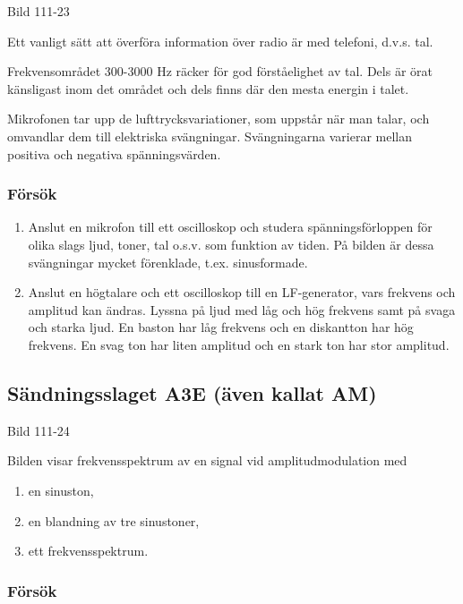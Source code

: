 \documentclass[a4paper,twoside,twocolumn,openright]{book}
\begin{document}
Bild 111-23

Ett vanligt sätt att överföra information över radio är med telefoni, d.v.s. tal.

Frekvensområdet 300-3000 Hz räcker för god förståelighet av tal. Dels är örat känsligast
inom det området och dels finns där den mesta energin i talet.

Mikrofonen tar upp de lufttrycksvariationer, som uppstår när man talar, och omvandlar dem
till elektriska svängningar. Svängningarna varierar mellan positiva och negativa
spänningsvärden.

\subsubsection{Försök}

\begin{enumerate}
\item Anslut en mikrofon till ett oscilloskop och studera spänningsförloppen för olika slags
ljud, toner, tal o.s.v. som funktion av tiden. På bilden är dessa svängningar mycket
förenklade, t.ex. sinusformade.

\item Anslut en högtalare och ett oscilloskop till en LF-generator, vars frekvens och amplitud
kan ändras. Lyssna på ljud med låg och hög frekvens samt på svaga och starka ljud. En
baston har låg frekvens och en diskantton har hög frekvens. En svag ton har liten
amplitud och en stark ton har stor amplitud.
\end{enumerate}

\subsection{Sändningsslaget A3E (även kallat AM)}

Bild 111-24

Bilden visar frekvensspektrum av en signal vid amplitudmodulation med

\begin{enumerate}[label=\alph*.,noitemsep]
\item en sinuston,
\item en blandning av tre sinustoner,
\item ett frekvensspektrum.
\end{enumerate}

\subsubsection{Försök}
\end{document}
